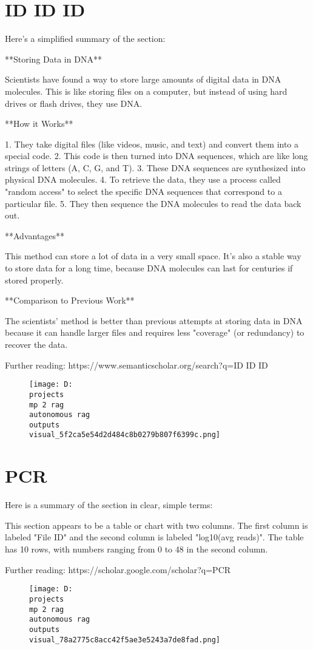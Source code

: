 \documentclass[12pt,a4paper]{article}
\begin{document}
\section{ID
ID
ID}
Here's a simplified summary of the section:

**Storing Data in DNA**

Scientists have found a way to store large amounts of digital data in DNA molecules. This is like storing files on a computer, but instead of using hard drives or flash drives, they use DNA.

**How it Works**

1. They take digital files (like videos, music, and text) and convert them into a special code.
2. This code is then turned into DNA sequences, which are like long strings of letters (A, C, G, and T).
3. These DNA sequences are synthesized into physical DNA molecules.
4. To retrieve the data, they use a process called "random access" to select the specific DNA sequences that correspond to a particular file.
5. They then sequence the DNA molecules to read the data back out.

**Advantages**

This method can store a lot of data in a very small space. It's also a stable way to store data for a long time, because DNA molecules can last for centuries if stored properly.

**Comparison to Previous Work**

The scientists' method is better than previous attempts at storing data in DNA because it can handle larger files and requires less "coverage" (or redundancy) to recover the data.

Further reading: https://www.semanticscholar.org/search?q=ID
ID
ID
\begin{figure}[h]
\centering
\texttt{[image: D:\\projects\\mp 2 rag\\autonomous rag\\outputs\\visual\_5f2ca5e54d2d484c8b0279b807f6399c.png]}
\end{figure}
\section{PCR}
Here is a summary of the section in clear, simple terms:

This section appears to be a table or chart with two columns. The first column is labeled "File ID" and the second column is labeled "log10(avg reads)". The table has 10 rows, with numbers ranging from 0 to 48 in the second column.

Further reading: https://scholar.google.com/scholar?q=PCR
\begin{figure}[h]
\centering
\texttt{[image: D:\\projects\\mp 2 rag\\autonomous rag\\outputs\\visual\_78a2775c8acc42f5ae3e5243a7de8fad.png]}
\end{figure}
\end{document}
